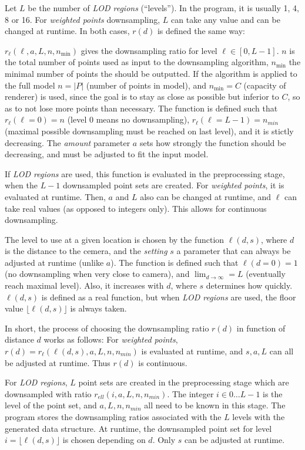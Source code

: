 \documentclass[a4paper,10pt,abstracton,notitlepage]{scrreprt}
\begin{document}
Let $L$ be the number of \emph{LOD regions} (``levels''). In the program, it is usually 1, 4, 8 or 16. For \emph{weighted points} downsampling, $L$ can take any value and can be changed at runtime. In both cases, $r(d)$ is defined the same way:

$r_{\ell}(\ell, a, L, n, n_{\min})$ gives the downsampling ratio for level $\ell \in [0, L-1]$. $n$ is the total number of points used as input to the downsampling algorithm, $n_{\min}$ the minimal number of points the should be outputted. If the algorithm is applied to the full model $n = |P|$ (number of points in model), and $n_{\min} = C$ (capacity of renderer) is used, since the goal is to stay as close as possible but inferior to $C$, so as to not lose more points than necessary. The function is defined such that $r_{\ell}(\ell = 0) = n$ (level 0 means no downsampling), $r_{\ell}(\ell = L-1) = n_{min}$ (maximal possible downsampling must be reached on last level), and it is stictly decreasing. The \emph{amount} parameter $a$ sets how strongly the function should be decreasing, and must be adjusted to fit the input model.

If \emph{LOD regions} are used, this function is evaluated in the preprocessing stage, when the $L-1$ downsampled point sets are created. For \emph{weighted points}, it is evaluated at runtime. Then, $a$ and $L$ also can be changed at runtime, and $\ell$ can take real values (as opposed to integers only). This allows for continuous downsampling.

The level to use at a given location is chosen by the function $\ell(d, s)$, where $d$ is the distance to the cemera, and the \emph{setting} $s$ a parameter that can always be adjusted at runtime (unlike $a$). The function is defined such that $\ell(d = 0) = 1$ (no downsampling when very close to camera), and $\lim_{d \rightarrow \infty} = L$ (eventually reach maximal level). Also, it increases with $d$, where $s$ determines how quickly. $\ell(d, s)$ is defined as a real function, but when \emph{LOD regions} are used, the floor value $\lfloor \ell(d, s) \rfloor$ is always taken.

In short, the process of choosing the downsampling ratio $r(d)$ in function of distance $d$ works as follows: For \emph{weighted points}, $r(d) = r_{\ell}(\ell(d, s), a, L, n, n_{min})$ is evaluated at runtime, and $s, a, L$ can all be adjusted at runtime. Thus $r(d)$ is continuous.

For \emph{LOD regions}, $L$ point sets are created in the preprocessing stage which are downsampled with ratio $r_{ell}(i, a, L, n, n_{min})$. The integer $i \in 0 \hdots L-1$ is the level of the point set, and $a, L, n, n_{min}$ all need to be known in this stage. The program stores the downsampling ratios associated with the $L$ levels with the generated data structure. At runtime, the downsampled point set for level $i = \lfloor \ell(d, s) \rfloor$ is chosen depending on $d$. Only $s$ can be adjusted at runtime.
\end{document}
